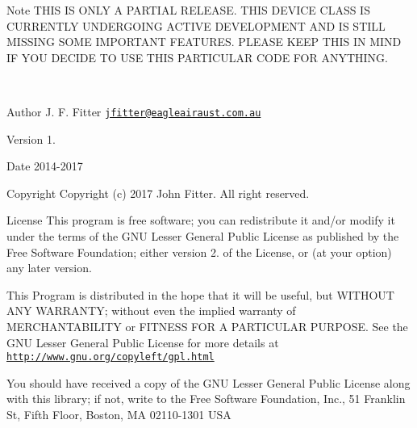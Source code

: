 \begin{DoxyNote}{Note}
T\+H\+IS IS O\+N\+LY A P\+A\+R\+T\+I\+AL R\+E\+L\+E\+A\+SE. T\+H\+IS D\+E\+V\+I\+CE C\+L\+A\+SS IS C\+U\+R\+R\+E\+N\+T\+LY U\+N\+D\+E\+R\+G\+O\+I\+NG A\+C\+T\+I\+VE D\+E\+V\+E\+L\+O\+P\+M\+E\+NT A\+ND IS S\+T\+I\+LL M\+I\+S\+S\+I\+NG S\+O\+ME I\+M\+P\+O\+R\+T\+A\+NT F\+E\+A\+T\+U\+R\+ES. P\+L\+E\+A\+SE K\+E\+EP T\+H\+IS IN M\+I\+ND IF Y\+OU D\+E\+C\+I\+DE TO U\+SE T\+H\+IS P\+A\+R\+T\+I\+C\+U\+L\+AR C\+O\+DE F\+OR A\+N\+Y\+T\+H\+I\+NG.
\end{DoxyNote}
~\newline
\begin{DoxyAuthor}{Author}
J. F. Fitter \href{mailto:jfitter@eagleairaust.com.au}{\tt jfitter@eagleairaust.\+com.\+au} ~\newline

\end{DoxyAuthor}
\begin{DoxyVersion}{Version}
1. ~\newline

\end{DoxyVersion}
\begin{DoxyDate}{Date}
2014-\/2017 ~\newline

\end{DoxyDate}
\begin{DoxyCopyright}{Copyright}
Copyright (c) 2017 John Fitter. All right reserved.
\end{DoxyCopyright}
\begin{DoxyParagraph}{License}
This program is free software; you can redistribute it and/or modify it under the terms of the G\+NU Lesser General Public License as published by the Free Software Foundation; either version 2. of the License, or (at your option) any later version. 
\end{DoxyParagraph}
\begin{DoxyParagraph}{}
This Program is distributed in the hope that it will be useful, but W\+I\+T\+H\+O\+UT A\+NY W\+A\+R\+R\+A\+N\+TY; without even the implied warranty of M\+E\+R\+C\+H\+A\+N\+T\+A\+B\+I\+L\+I\+TY or F\+I\+T\+N\+E\+SS F\+OR A P\+A\+R\+T\+I\+C\+U\+L\+AR P\+U\+R\+P\+O\+SE. See the G\+NU Lesser General Public License for more details at \href{http://www.gnu.org/copyleft/gpl.html}{\tt http\+://www.\+gnu.\+org/copyleft/gpl.\+html} 
\end{DoxyParagraph}
\begin{DoxyParagraph}{}
You should have received a copy of the G\+NU Lesser General Public License along with this library; if not, write to the Free Software Foundation, Inc., 51 Franklin St, Fifth Floor, Boston, MA 02110-\/1301 U\+SA 
\end{DoxyParagraph}


